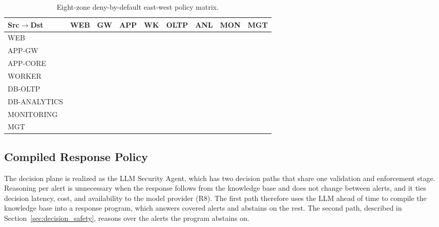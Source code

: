 \documentclass[final,5p]{elsarticle}
\newcommand{\cmark}{\textcolor{ForestGreen}{\ding{51}}}
\newcommand{\xmark}{\textcolor{BrickRed}{\ding{55}}}
\begin{document}
\begin{table}[tbp]
    \centering
    \caption{Eight-zone deny-by-default east-west policy matrix.}
    \label{tab:policy_matrix}
    \scriptsize
    \setlength{\tabcolsep}{0.8pt}
    \renewcommand{\arraystretch}{1.05}
    \begin{tabular}{@{}lcccccccc@{}}
        \toprule
        \textbf{Src$\rightarrow$Dst} & \textbf{WEB} & \textbf{GW} & \textbf{APP} & \textbf{WK} & \textbf{OLTP} & \textbf{ANL} & \textbf{MON} & \textbf{MGT} \\
        \midrule
        WEB          &  & \cmark & \xmark & \xmark & \xmark & \xmark & \xmark & \xmark \\
        APP-GW       & \xmark &  & \cmark & \xmark & \xmark & \xmark & \xmark & \xmark \\
        APP-CORE     & \xmark & \xmark &  & \cmark & \cmark & \cmark & \xmark & \xmark \\
        WORKER       & \xmark & \xmark & \xmark &  & \cmark & \xmark & \xmark & \xmark \\
        DB-OLTP      & \xmark & \xmark & \xmark & \xmark &  & \cmark & \xmark & \xmark \\
        DB-ANALYTICS & \xmark & \xmark & \xmark & \xmark & \xmark &  & \xmark & \xmark \\
        MONITORING   & \cmark & \cmark & \cmark & \cmark & \cmark & \cmark &  & \xmark \\
        MGT          & \cmark & \cmark & \cmark & \cmark & \cmark & \cmark & \cmark &  \\
        \bottomrule
    \end{tabular}
\end{table}

\subsection{Compiled Response Policy}
\label{sec:compiled_policy}

The decision plane is realized as the LLM Security Agent, which has two decision paths that share one validation and enforcement stage. Reasoning per alert is unnecessary when the response follows from the knowledge base and does not change between alerts, and it ties decision latency, cost, and availability to the model provider (R8). The first path therefore uses the LLM ahead of time to compile the knowledge base into a response program, which answers covered alerts and abstains on the rest. The second path, described in Section~\ref{sec:decision_safety}, reasons over the alerts the program abstains on.
\end{document}
